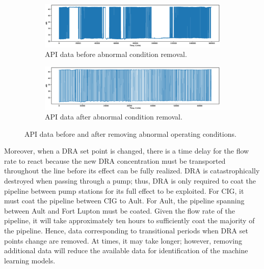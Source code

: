 \begin{figure}[h]
     \centering
     \begin{subfigure}[b]{1.0\textwidth}
         \centering
         \includegraphics[width=\textwidth]{images/08NonFilteredDensity.eps}
         \caption{API data before abnormal condition removal.}
         \label{fig:08APIBefore}
     \end{subfigure}
     \hfill
     \begin{subfigure}[b]{1.0\textwidth}
         \centering
         \includegraphics[width=\textwidth]{images/08FilteredDensity.eps}
         \caption{API data after abnormal condition removal.}
         \label{fig:08APIAfter}
     \end{subfigure}
        \caption{API data before and after removing abnormal operating conditions.}
        \label{fig:08API}
\end{figure}

Moreover, when a DRA set point is changed, there is a time delay for the flow rate to react because the new DRA concentration must be transported throughout the line before its effect can be fully realized.  DRA is catastrophically destroyed when passing through a pump; thus, DRA is only required to coat the pipeline between pump stations for its full effect to be exploited.  For CIG, it must coat the pipeline between CIG to Ault.  For Ault, the pipeline spanning between Ault and Fort Lupton must be coated.  Given the flow rate of the pipeline, it will take approximately ten hours to sufficiently coat the majority of the pipeline. Hence, data corresponding to transitional periods when DRA set points change are removed. At times, it may take longer; however, removing additional data will reduce the available data for identification of the machine learning models.  

